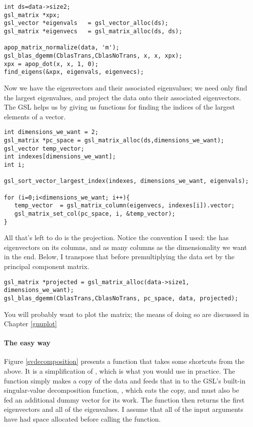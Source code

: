 \begin{lstlisting}
int ds=data->size2;
gsl_matrix *xpx;
gsl_vector *eigenvals   = gsl_vector_alloc(ds);
gsl_matrix *eigenvecs   = gsl_matrix_alloc(ds, ds);

apop_matrix_normalize(data, 'm');
gsl_blas_dgemm(CblasTrans,CblasNoTrans, x, x, xpx);
xpx = apop_dot(x, x, 1, 0);
find_eigens(&xpx, eigenvals, eigenvecs);
\end{lstlisting}

Now we have the eigenvectors and their associated eigenvalues; we need only find
the largest eigenvalues, and project the data onto their associated eigenvectors.
The GSL helps us by giving us functions for
finding the indices of the largest elements of a vector.
\begin{lstlisting}
int dimensions_we_want = 2;
gsl_matrix *pc_space = gsl_matrix_alloc(ds,dimensions_we_want);
gsl_vector temp_vector;
int indexes[dimensions_we_want];
int i;

gsl_sort_vector_largest_index(indexes, dimensions_we_want, eigenvals);

for (i=0;i<dimensions_we_want; i++){
   temp_vector  = gsl_matrix_column(eigenvecs, indexes[i]).vector;
   gsl_matrix_set_col(pc_space, i, &temp_vector);
}
\end{lstlisting}

All that's left to do is the projection. Notice the convention I used:
the  has eigenvectors on its columns, and as many columns as the
dimensionality we want in the end. Below, I transpose that before premultiplying
the data set by the principal component matrix.

\begin{lstlisting}
gsl_matrix *projected = gsl_matrix_alloc(data->size1, dimensions_we_want);
gsl_blas_dgemm(CblasTrans,CblasNoTrans, pc_space, data, projected);
\end{lstlisting}

You will probably want to plot the  matrix; the means
of doing so are discussed in Chapter \ref{gnuplot}

\paragraph{The easy way}

Figure \ref{svdecomposition} presents a function that takes some
shortcuts from the above. It is a
simplification of , which is what you would use in practice. The function simply makes
a copy of the data and feeds that in to the GSL's built-in singular-value
decomposition function, , which eats the copy, and must also be fed an
additional dummy vector for its work. The function then returns the first
 eigenvectors and all of the eigenvalues. I
assume that all of the input arguments have had space allocated before
calling the function.  

